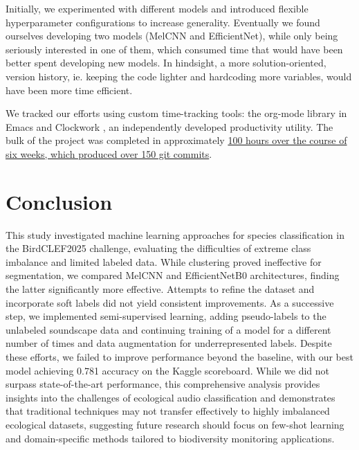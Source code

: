 \documentclass[11pt]{article}
\begin{document}
Initially, we experimented with different models and introduced flexible hyperparameter configurations to increase generality. Eventually we found ourselves developing two models (MelCNN and EfficientNet), while only being seriously interested in one of them, which consumed time that would have been better spent developing new models. In hindsight, a more solution-oriented, version history, ie. keeping the code lighter and hardcoding more variables, would have been more time efficient.

We tracked our efforts using custom time-tracking tools: the org-mode library \cite{doom_emacs} in Emacs \cite{gnu_emacs} and Clockwork \cite{clockwork}, an independently developed productivity utility. The bulk of the project was completed in approximately \underline{100 hours over the course of six weeks, which produced over 150 git commits}.

\section*{Conclusion}
This study investigated machine learning approaches for species classification in the BirdCLEF2025 challenge, evaluating the difficulties of extreme class imbalance and limited labeled data. While clustering proved ineffective for segmentation, we compared MelCNN and EfficientNetB0 architectures, finding the latter significantly more effective. Attempts to refine the dataset and incorporate soft labels did not yield consistent improvements. As a successive step, we implemented semi-supervised learning, adding pseudo-labels to the unlabeled soundscape data and continuing training of a model for a different number of times and data augmentation for underrepresented labels. Despite these efforts, we failed to improve performance beyond the baseline, with our best model achieving 0.781 accuracy on the Kaggle scoreboard. While we did not surpass state-of-the-art performance, this comprehensive analysis provides insights into the challenges of ecological audio classification and demonstrates that traditional techniques may not transfer effectively to highly imbalanced ecological datasets, suggesting future research should focus on few-shot learning and domain-specific methods tailored to biodiversity monitoring applications.

\newpage
\end{document}

